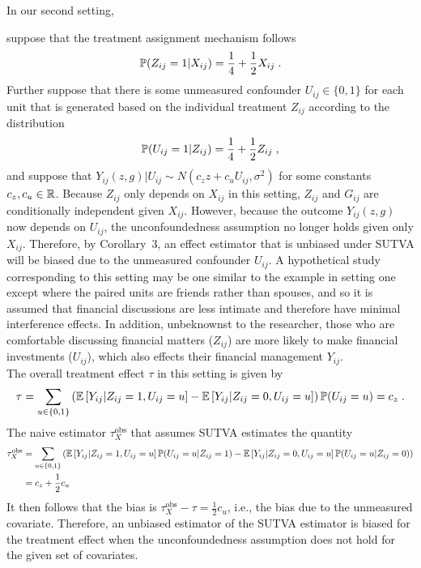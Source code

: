 \documentclass[10pt]{article}
\begin{document}
In our second setting,

suppose that the treatment assignment mechanism follows
\[
\P(Z_{ij}=1|X_{ij}) = \frac{1}{4} + \frac{1}{2}X_{ij} \;.
\]
Further suppose that there is some unmeasured confounder $U_{ij}\in\{0,1\}$ for each unit that is generated based on the individual treatment $Z_{ij}$ according to the distribution
\[
\P(U_{ij}=1|Z_{ij}) = \frac{1}{4} + \frac{1}{2}Z_{ij}\;,
\]
and suppose that $Y_{ij}(z,g)|U_{ij}\sim N(c_zz+c_uU_{ij},\sigma^2)$ for some constants $c_z,c_u\in\bbR$. Because $Z_{ij}$ only depends on $X_{ij}$ in this setting, $Z_{ij}$ and $G_{ij}$ are conditionally independent given $X_{ij}$. However, because the outcome $Y_{ij}(z,g)$ now depends on $U_{ij}$, the unconfoundedness assumption no longer holds given only $X_{ij}$. Therefore, by Corollary~3, an effect estimator that is unbiased under SUTVA will be biased due to the unmeasured confounder $U_{ij}$. A hypothetical study corresponding to this setting may be one similar to the example in setting one except where the paired units are friends rather than spouses, and so it is assumed that financial discussions are less intimate and therefore have minimal interference effects. In addition, unbeknownst to the researcher, those who are comfortable discussing financial matters ($Z_{ij}$) are more likely to make financial investments ($U_{ij}$), which also effects their financial management $Y_{ij}$.
\\


The overall treatment effect $\tau$ in this setting is given by
\[
\tau = \sum_{u\in\{0,1\}}\left(\E\left[Y_{ij}|Z_{ij}=1,U_{ij}=u\right] - \E\left[Y_{ij}|Z_{ij}=0,U_{ij}=u\right]\right)\P(U_{ij}=u) = c_z \;.
\]
The naive estimator $\tau_{X}^\text{obs}$ that assumes SUTVA estimates the quantity
\begin{align*}
\tau_{X}^\text{obs} &= \sum_{u\in\{0,1\}}\left(\E\left[Y_{ij}|Z_{ij}=1,U_{ij}=u\right]\P(U_{ij}=u|Z_{ij}=1) - \E\left[Y_{ij}|Z_{ij}=0,U_{ij}=u\right]\P(U_{ij}=u|Z_{ij}=0)\right) \\
&= c_z + \frac{1}{2}c_u
\end{align*}
It then follows that the bias is $\tau_{X}^\text{obs} - \tau = \frac{1}{2}c_u$, i.e., the bias due to the unmeasured covariate. Therefore, an unbiased estimator of the SUTVA estimator is biased for the treatment effect when the unconfoundedness assumption does not hold for the given set of covariates.
\\
\end{document}
